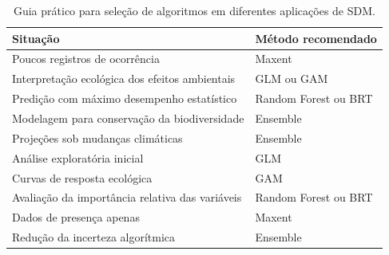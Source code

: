 \begin{table}[H]
	\centering
	\caption{Guia prático para seleção de algoritmos em diferentes aplicações de SDM.}
	\label{tab:guia_escolha_algoritmos}
	
	\small
	
	\begin{tabular}{
			p{}
			p{}
		}
		
		\toprule
		\textbf{Situação} &
		\textbf{Método recomendado} \\
		\midrule
		
		Poucos registros de ocorrência &
		Maxent \\
		
		Interpretação ecológica dos efeitos ambientais &
		GLM ou GAM \\
		
		Predição com máximo desempenho estatístico &
		Random Forest ou BRT \\
		
		Modelagem para conservação da biodiversidade &
		Ensemble \\
		
		Projeções sob mudanças climáticas &
		Ensemble \\
		
		Análise exploratória inicial &
		GLM \\
		
		Curvas de resposta ecológica &
		GAM \\
		
		Avaliação da importância relativa das variáveis &
		Random Forest ou BRT \\
		
		Dados de presença apenas &
		Maxent \\
		
		Redução da incerteza algorítmica &
		Ensemble \\
		
		\bottomrule
		
	\end{tabular}
	
\end{table}

\begin{center}
\end{center}

